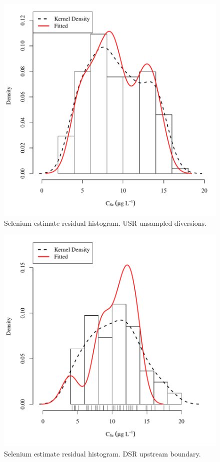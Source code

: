 \begin{figure}[htbp]
	\begin{center}
	\includegraphics[width=6in]{"Figures/Results_USR/Conc Model ResDist UDIV"}
	\caption{Selenium estimate residual histogram.  USR unsampled diversions.}
	\end{center}
\end{figure}
\newpage

\begin{figure}[htbp]
	\begin{center}
	\includegraphics[width=6in]{"Figures/Results_DSR/Conc Model ResDist D101C"}
	\caption{Selenium estimate residual histogram.  DSR upstream boundary.}
	\end{center}
\end{figure}
\newpage

